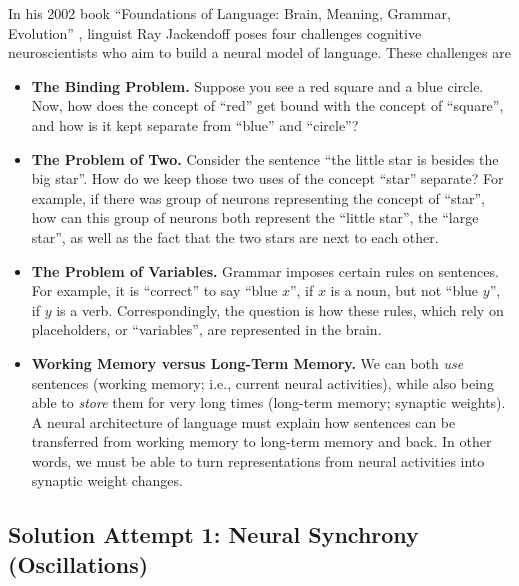 \documentclass[10pt,letterpaper,oneside]{article}
\begin{document}
In his 2002 book \enquote{Foundations of Language: Brain, Meaning, Grammar, Evolution} \cite{jackendoff2002foundations}, linguist Ray Jackendoff poses four challenges cognitive neuroscientists who aim to build a neural model of language. These challenges are
\newcommand{\RS}{$\color{Crimson}\blacksquare$}
\newcommand{\BC}{$\color{RoyalBlue}\bullet$}
\begin{itemize}
	\item \textbf{The Binding Problem.} Suppose you see a red square and a blue circle. Now, how does the concept of \enquote{red} get bound with the concept of \enquote{square}, and how is it kept separate from \enquote{blue} and \enquote{circle}?
	\item \textbf{The Problem of Two.} Consider the sentence \enquote{the little star is besides the big star}. How do we keep those two uses of the concept \enquote{star} separate? For example, if there was group of neurons representing the concept of \enquote{star}, how can this group of neurons both represent the \enquote{little star}, the \enquote{large star}, as well as the fact that the two stars are next to each other.
	\item \textbf{The Problem of Variables.} Grammar imposes certain rules on sentences. For example, it is \enquote{correct} to say \enquote{blue $x$}, if $x$ is a noun, but not \enquote{blue $y$}, if $y$ is a verb. Correspondingly, the question is how these rules, which rely on placeholders, or \enquote{variables}, are represented in the brain.
	\item \textbf{Working Memory versus Long-Term Memory.} We can both \emph{use} sentences (working memory; i.e., current neural activities), while also being able to \emph{store} them for very long times (long-term memory; synaptic weights). A neural architecture of language must explain how sentences can be transferred from working memory to long-term memory and back. In other words, we must be able to turn representations from neural activities into synaptic weight changes.
\end{itemize}

\subsection{Solution Attempt 1: Neural Synchrony (Oscillations)}
\end{document}
